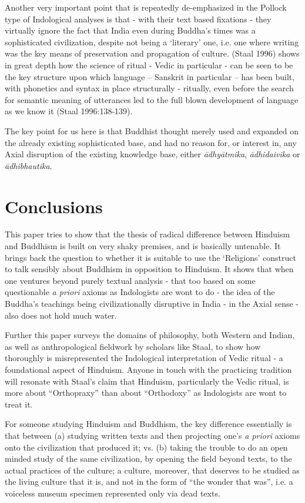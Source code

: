 Another very important point that is repeatedly de-emphasized in the Pollock type of Indological analyses is that - with their text based fixations - they virtually ignore the fact that India even during Buddha’s times was a sophisticated civilization, despite not being a ‘literary’ one, i.e. one where writing was the key means of preservation and propagation of culture. (Staal 1996) shows in great depth how the science of ritual - Vedic in particular - can be seen to be the key structure upon which language – Sanskrit in particular – has been built, with phonetics and syntax in place structurally - ritually, even before the search for semantic meaning of utterances led to the full blown development of language as we know it (Staal 1996:138-139).

The key point for us here is that Buddhist thought merely used and expanded on the already existing sophisticated base, and had no reason for, or interest in, any Axial disruption of the existing knowledge base, either \textit{ādhyātmika}, \textit{ādhidaivika} or\textit{ ādhibhautika}.

\vspace{-.3cm}

\section*{Conclusions}

This paper tries to show that the thesis of radical difference between Hinduism and Buddhism is built on very shaky premises, and is basically untenable. It brings back the question to whether it is suitable to use the ‘Religions’ construct to talk sensibly about Buddhism in opposition to Hinduism. It shows that when one ventures beyond purely textual analysis - that too based on some questionable \textit{a priori} axioms as Indologists are wont to do - the idea of the Buddha’s teachings being civilizationally disruptive in India - in the Axial sense - also does not hold much water.

Further this paper surveys the domains of philosophy, both Western and Indian, as well as anthropological fieldwork by scholars like Staal, to show how thoroughly is misrepresented the Indological interpretation of Vedic ritual - a foundational aspect of Hinduism. Anyone in touch with the practicing tradition will resonate with Staal’s claim that Hinduism, particularly the Vedic ritual, is more about “Orthopraxy” than about “Orthodoxy” as Indologists are wont to treat it.

For someone studying Hinduism and Buddhism, the key difference essentially is that between (a) studying written texts and then projecting one’s \textit{a priori} axioms onto the civilization that produced it; vs. (b) taking the trouble to do an open minded study of the same civilization, by opening the field beyond texts, to the actual practices of the culture; a culture, moreover, that deserves to be studied as the living culture that it is, and not in the form of “the wonder that was”, i.e. a voiceless museum specimen represented only via dead texts.

